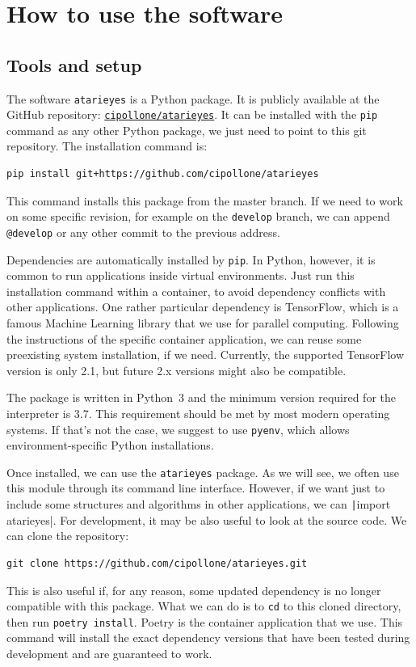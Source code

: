 \section{How to use the software}

\label{sec:how-to-use}

\subsection{Tools and setup}

The software \texttt{atarieyes} is a Python package. It is publicly available
at the GitHub repository:
\href{https://github.com/cipollone/atarieyes}{\texttt{cipollone/atarieyes}}.
It can be installed with the \texttt{pip} command as any other Python package,
we just need to point to this git repository. The installation
command is:
\begin{verbatim}
pip install git+https://github.com/cipollone/atarieyes
\end{verbatim}
This command installs this package from the master branch. If we need to work
on some specific revision, for example on the \texttt{develop} branch, we can
append \verb!@develop! or any other commit to the previous address.

Dependencies are automatically installed by \texttt{pip}. In Python, however,
it is common to run applications inside virtual environments. Just run this
installation command within a container, to avoid dependency conflicts with
other applications. One rather particular dependency is TensorFlow, which is a
famous Machine Learning library that we use for parallel computing. Following
the instructions of the specific container application, we can reuse some
preexisting system installation, if we need. Currently, the supported
TensorFlow version is only 2.1, but future 2.x versions might also be
compatible.

The package is written in Python~3 and the minimum version required for the
interpreter is 3.7. This requirement should be met by most modern operating
systems. If that's not the case, we suggest to use \texttt{pyenv}, which
allows environment-specific Python installations.

Once installed, we can use the \texttt{atarieyes} package. As we will see, we
often use this module through its command line interface. However, if we want
just to include some structures and algorithms in other applications, we can
\texttt|import atarieyes|. For development, it may be also useful to
look at the source code. We can clone the repository:
\begin{verbatim}
git clone https://github.com/cipollone/atarieyes.git
\end{verbatim}
This is also useful if, for any reason, some updated dependency is no longer
compatible with this package. What we can do is to \texttt{cd} to this cloned
directory, then run \verb|poetry install|. Poetry is the container
application that we use. This command will install the exact dependency
versions that have been tested during development and are guaranteed to work.


